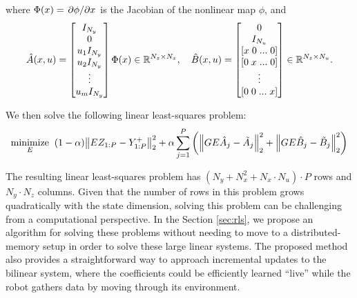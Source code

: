 \documentclass{article}
\begin{document}
where $\Phi(x) = \pdv*{\phi}{x}$ is the Jacobian of the nonlinear map $\phi$, and
\begin{equation}
  \hat{A}(x,u) =  \begin{bmatrix} 
    I_{N_y} \\ 0 \\ u_1 I_{N_y} \\ u_2 I_{N_y} \\ \vdots \\ u_m I_{N_y} 
  \end{bmatrix} \Phi(x) \in \mathbb{R}^{N_z \times N_x}, \quad
  \hat{B}(x,u) = \begin{bmatrix} 
    0 \\ 
    I_{N_u} \\ 
    [x \; 0 \; ... \; 0] \\
    [0 \; x \; ... \; 0] \\
    \vdots \\
    [0 \; 0 \; ... \; x] \\
  \end{bmatrix} \in \mathbb{R}^{N_z \times N_u}.
\end{equation}

We then solve the following linear least-squares problem:
\begin{align} \label{opt:jdmd}
  \underset{E}{\text{minimize}} \;\; 
    (1-\alpha) \norm{E Z_{1:P} - Y_{1:P}^+}_2^2 + 
        \alpha \sum_{j=1}^P \left( 
          \norm{G E \hat{A}_j - \tilde{A}_j}_2^2 + 
          \norm{G E \hat{B}_j - \tilde{B}_j}_2^2 \right)
\end{align}

The resulting linear least-squares problem has $(N_y + N_x^2 + N_x \cdot N_u) \cdot P$ rows
and $N_y \cdot N_z$ columns. Given that the number of rows in this problem grows
quadratically with the state dimension, solving this problem can be challenging from a
computational perspective. In the Section \ref{sec:rls}, we propose an algorithm for solving
these problems without needing to move to a distributed-memory setup in order to solve these
large linear systems. The proposed method also provides a straightforward way to approach
incremental updates to the bilinear system, where the coefficients could be efficiently
learned ``live'' while the robot gathers data by moving through its environment.

\end{document}
